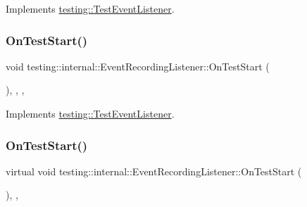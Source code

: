 Implements \mbox{\hyperlink{classtesting_1_1_test_event_listener_a5f6c84f39851e8a603a2d2e10063816b}{testing\+::\+Test\+Event\+Listener}}.

\mbox{\label{classtesting_1_1internal_1_1_event_recording_listener_ad850af9e4276b9bfba61435b97a02094}} 
\subsubsection{\texorpdfstring{OnTestStart()}{OnTestStart()}\hspace{0.1cm}{\footnotesize\ttfamily [1/3]}}
{\footnotesize\ttfamily void testing\+::internal\+::\+Event\+Recording\+Listener\+::\+On\+Test\+Start (\begin{DoxyParamCaption}\item[{const \mbox{\hyperlink{classtesting_1_1_test_info}{Test\+Info}} \&}]{ }\end{DoxyParamCaption})\hspace{0.3cm}{\ttfamily [inline]}, {\ttfamily [override]}, {\ttfamily [protected]}, {\ttfamily [virtual]}}



Implements \mbox{\hyperlink{classtesting_1_1_test_event_listener_ab4f6a0ca16ae75daf385b3b5914e1048}{testing\+::\+Test\+Event\+Listener}}.

\mbox{\label{classtesting_1_1internal_1_1_event_recording_listener_aebd488b780fc172d6058ca07ca8f7145}} 
\subsubsection{\texorpdfstring{OnTestStart()}{OnTestStart()}\hspace{0.1cm}{\footnotesize\ttfamily [2/3]}}
{\footnotesize\ttfamily virtual void testing\+::internal\+::\+Event\+Recording\+Listener\+::\+On\+Test\+Start (\begin{DoxyParamCaption}\item[{const \mbox{\hyperlink{classtesting_1_1_test_info}{Test\+Info}} \&}]{ }\end{DoxyParamCaption})\hspace{0.3cm}{\ttfamily [inline]}, {\ttfamily [protected]}, {\ttfamily [virtual]}}



